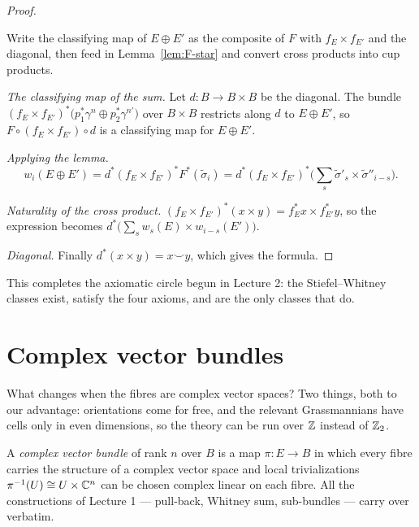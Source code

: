 \begin{proof}
\begin{strategy}
Write the classifying map of $E\oplus E'$ as the composite of $F$ with
$f_E\times f_{E'}$ and the diagonal, then feed in Lemma~\ref{lem:F-star} and
convert cross products into cup products.
\end{strategy}

 \emph{The classifying map of the sum.} Let $d\colon B\to B\times B$ be
the diagonal. The bundle $(f_E\times f_{E'})^*\big(p_1^*\gamma^n\oplus
p_2^*\gamma^{n'}\big)$ over $B\times B$ restricts along $d$ to $E\oplus E'$, so
$F\circ(f_E\times f_{E'})\circ d$ is a classifying map for $E\oplus E'$.

 \emph{Applying the lemma.}
\[
w_i(E\oplus E')
=d^*(f_E\times f_{E'})^*F^*(\tilde\sigma_i)
=d^*(f_E\times f_{E'})^*\Big(\sum_s\tilde\sigma'_s\times\tilde\sigma''_{i-s}\Big).
\]

 \emph{Naturality of the cross product.}
$(f_E\times f_{E'})^*(x\times y)=f_E^*x\times f_{E'}^*y$, so the expression
becomes $d^*\big(\sum_s w_s(E)\times w_{i-s}(E')\big)$.

 \emph{Diagonal.} Finally $d^*(x\times y)=x\smile y$, which gives the
formula.
\end{proof}

This completes the axiomatic circle begun in Lecture 2: the Stiefel--Whitney
classes exist, satisfy the four axioms, and are the only classes that do.

\section{Complex vector bundles}

\begin{guiding}
What changes when the fibres are complex vector spaces? Two things, both to our
advantage: orientations come for free, and the relevant Grassmannians have cells
only in even dimensions, so the theory can be run over $\mathbb{Z}$ instead of $\mathbb{Z}_2$.
\end{guiding}

\begin{definition}
A \emph{complex vector bundle} of rank $n$ over $B$ is a map $\pi\colon E\to B$
in which every fibre carries the structure of a complex vector space and local
trivializations $\pi^{-1}(U)\cong U\times\mathbb{C}^n$ can be chosen complex linear on
each fibre. All the constructions of Lecture 1 --- pull-back, Whitney sum,
sub-bundles --- carry over verbatim.
\end{definition}


